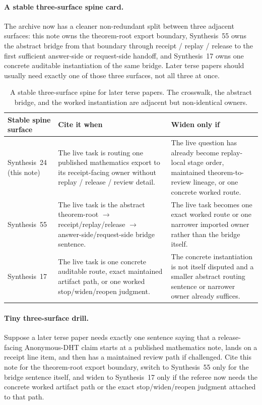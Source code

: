\documentclass[11pt]{article}
\begin{document}
\paragraph{A stable three-surface spine card.}
The archive now has a cleaner non-redundant split between three adjacent surfaces: this note owns the theorem-root export boundary, Synthesis~55 owns the abstract bridge from that boundary through receipt / replay / release to the first sufficient answer-side or request-side handoff, and Synthesis~17 owns one concrete auditable instantiation of the same bridge. Later terse papers should usually need exactly one of those three surfaces, not all three at once.\cite{series:workedexample,series:seriesspines}

\begin{table}[t]
\centering
\small
\begin{tabularx}{\linewidth}{@{}lX X@{}}
\toprule
Stable spine surface & Cite it when & Widen only if \\
\midrule
Synthesis~24 (this note) & The live task is routing one published mathematics export to its receipt-facing owner without replay / release / review detail. & The live question has already become replay-local stage order, maintained theorem-to-review lineage, or one concrete worked route. \\
Synthesis~55 & The live task is the abstract theorem-root $\to$ receipt/replay/release $\to$ answer-side/request-side bridge sentence. & The live task becomes one exact worked route or one narrower imported owner rather than the bridge itself. \\
Synthesis~17 & The live task is one concrete auditable route, exact maintained artifact path, or one worked stop/widen/reopen judgment. & The concrete instantiation is not itself disputed and a smaller abstract routing sentence or narrower owner already suffices. \\
\bottomrule
\end{tabularx}
\caption{A stable three-surface spine for later terse papers. The crosswalk, the abstract bridge, and the worked instantiation are adjacent but non-identical owners.}
\label{tab:mathcrosswalk-three-surface-spine}
\end{table}

\paragraph{Tiny three-surface drill.}
Suppose a later terse paper needs exactly one sentence saying that a release-facing Anonymous-DHT claim starts at a published mathematics note, lands on a receipt line item, and then has a maintained review path if challenged. Cite this note for the theorem-root export boundary, switch to Synthesis~55 only for the bridge sentence itself, and widen to Synthesis~17 only if the referee now needs the concrete worked artifact path or the exact stop/widen/reopen judgment attached to that path.\cite{series:workedexample,series:seriesspines}
\end{document}
